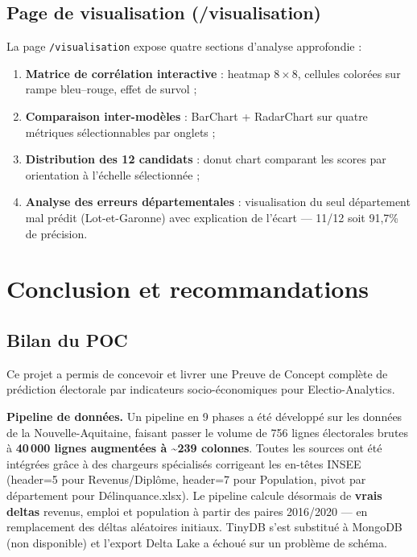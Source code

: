 \documentclass[12pt,a4paper,oneside]{report}
\begin{document}
\section{Page de visualisation (/visualisation)}

La page \texttt{/visualisation} expose quatre sections d'analyse approfondie :

\begin{enumerate}
  \item \textbf{Matrice de corrélation interactive} : heatmap $8 \times 8$, cellules colorées sur rampe bleu–rouge, effet de survol ;
  \item \textbf{Comparaison inter-modèles} : BarChart + RadarChart sur quatre métriques sélectionnables par onglets ;
  \item \textbf{Distribution des 12 candidats} : donut chart comparant les scores par orientation à l'échelle sélectionnée ;
  \item \textbf{Analyse des erreurs départementales} : visualisation du seul département mal prédit (Lot-et-Garonne) avec explication de l'écart — 11/12 soit 91,7\% de précision.
\end{enumerate}

\chapter*{Conclusion et recommandations}

\section*{Bilan du POC}

Ce projet a permis de concevoir et livrer une Preuve de Concept complète de prédiction électorale par indicateurs socio-économiques pour Electio-Analytics.

\textbf{Pipeline de données.} Un pipeline en 9 phases a été développé sur les données de la Nouvelle-Aquitaine, faisant passer le volume de 756 lignes électorales brutes à \textbf{40\,000 lignes augmentées à \textasciitilde{}239 colonnes}. Toutes les sources ont été intégrées grâce à des chargeurs spécialisés corrigeant les en-têtes INSEE (header=5 pour Revenus/Diplôme, header=7 pour Population, pivot par département pour Délinquance.xlsx). Le pipeline calcule désormais de \textbf{vrais deltas} revenus, emploi et population à partir des paires 2016/2020 — en remplacement des déltas aléatoires initiaux. TinyDB s'est substitué à MongoDB (non disponible) et l'export Delta Lake a échoué sur un problème de schéma.
\end{document}

